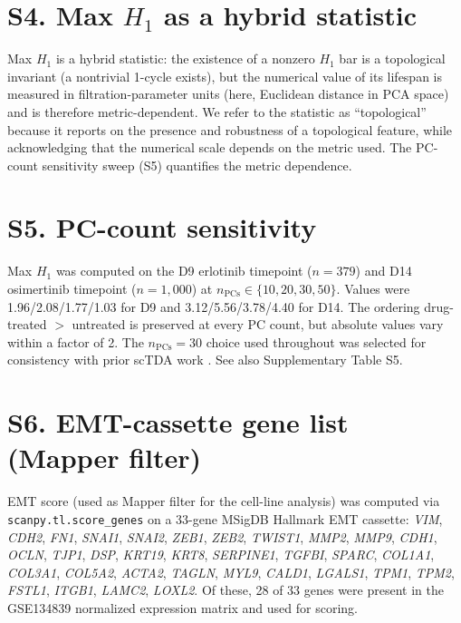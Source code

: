 \documentclass[11pt,a4paper]{article}
\begin{document}
\section*{S4. Max $H_1$ as a hybrid statistic}

Max $H_1$ is a hybrid statistic: the existence of a nonzero $H_1$ bar
is a topological invariant (a nontrivial 1-cycle exists), but the
numerical value of its lifespan is measured in filtration-parameter
units (here, Euclidean distance in PCA space) and is therefore
metric-dependent. We refer to the statistic as ``topological'' because
it reports on the presence and robustness of a topological feature,
while acknowledging that the numerical scale depends on the metric
used. The PC-count sensitivity sweep (S5) quantifies the metric
dependence.

\section*{S5. PC-count sensitivity}

Max $H_1$ was computed on the D9 erlotinib timepoint ($n = 379$) and
D14 osimertinib timepoint ($n = 1{,}000$) at $n_{\text{PCs}} \in
\{10, 20, 30, 50\}$. Values were 1.96/2.08/1.77/1.03 for D9 and
3.12/5.56/3.78/4.40 for D14. The ordering drug-treated $>$ untreated
is preserved at every PC count, but absolute values vary within a
factor of 2. The $n_{\text{PCs}} = 30$ choice used throughout was
selected for consistency with prior scTDA work \citep{rizvi2017}.
See also Supplementary Table S5.

\section*{S6. EMT-cassette gene list (Mapper filter)}

EMT score (used as Mapper filter for the cell-line analysis) was
computed via \texttt{scanpy.tl.score\_genes} on a 33-gene MSigDB
Hallmark EMT cassette: \emph{VIM}, \emph{CDH2}, \emph{FN1},
\emph{SNAI1}, \emph{SNAI2}, \emph{ZEB1}, \emph{ZEB2}, \emph{TWIST1},
\emph{MMP2}, \emph{MMP9}, \emph{CDH1}, \emph{OCLN}, \emph{TJP1},
\emph{DSP}, \emph{KRT19}, \emph{KRT8}, \emph{SERPINE1}, \emph{TGFBI},
\emph{SPARC}, \emph{COL1A1}, \emph{COL3A1}, \emph{COL5A2},
\emph{ACTA2}, \emph{TAGLN}, \emph{MYL9}, \emph{CALD1}, \emph{LGALS1},
\emph{TPM1}, \emph{TPM2}, \emph{FSTL1}, \emph{ITGB1}, \emph{LAMC2},
\emph{LOXL2}. Of these, 28 of 33 genes were present in the GSE134839
normalized expression matrix and used for scoring.
\end{document}
